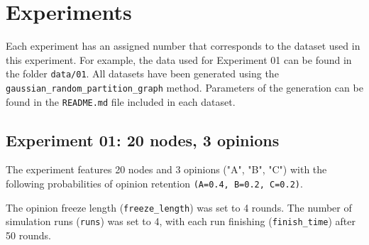 \documentclass[11pt]{article}
\begin{document}
\section{Experiments}
\label{Section:Experiments}

Each experiment has an assigned number that corresponds to the dataset used in this experiment. For example, the data used for Experiment 01 can be found in the folder \verb|data/01|. All datasets have been generated using the \verb|gaussian_random_partition_graph| method. Parameters of the generation can be found in the \verb|README.md| file included in each dataset.

\pagebreak

\subsection*{Experiment 01: 20 nodes, 3 opinions}

The experiment features 20 nodes and 3 opinions ("A", "B", "C") with the following probabilities of opinion retention \verb|(A=0.4, B=0.2, C=0.2)|.

\medskip

\noindent The opinion freeze length (\verb|freeze_length|) was set to 4 rounds. The number of simulation runs (\verb|runs|) was set to 4, with each run finishing (\verb|finish_time|) after 50 rounds.
\end{document}
